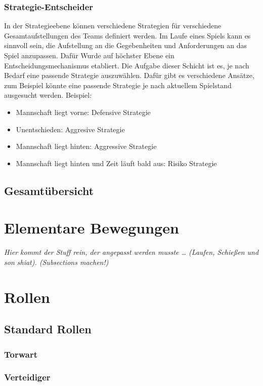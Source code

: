 \documentclass[fontsize=12pt,a4paper,draft]{scrartcl}[2003/01/01]
\begin{document}
\subsubsection{Strategie-Entscheider}
In der Strategieebene können verschiedene Strategien für verschiedene Gesamtaufstellungen des Teams definiert werden. Im Laufe eines Spiels kann es sinnvoll sein, die Aufstellung an die Gegebenheiten und Anforderungen an das Spiel anzupassen. Dafür Wurde auf höchster Ebene ein Entscheidungsmechanismus etabliert. Die Aufgabe dieser Schicht ist es, je nach Bedarf eine passende Strategie auszuwählen. Dafür gibt es verschiedene Ansätze, zum Beispiel könnte eine passende Strategie je nach aktuellem Spielstand ausgesucht werden. Beispiel: 
\begin{itemize}
\item Mannschaft liegt vorne: Defensive Strategie
\item Unentschieden: Aggresive Strategie
\item Mannschaft liegt hinten: Aggressive Strategie
\item Mannschaft liegt hinten und Zeit läuft bald aus: Risiko Strategie
\end{itemize}
\subsection{Gesamtübersicht}

\section{Elementare Bewegungen}
\textit{Hier kommt der Stuff rein, der angepasst werden musste \dots
(Laufen, Schießen und son shiat). (Subsections machen!)}

\section{Rollen}

\subsection{Standard Rollen}

\subsubsection{Torwart}
\subsubsection{Verteidiger}
\end{document}
